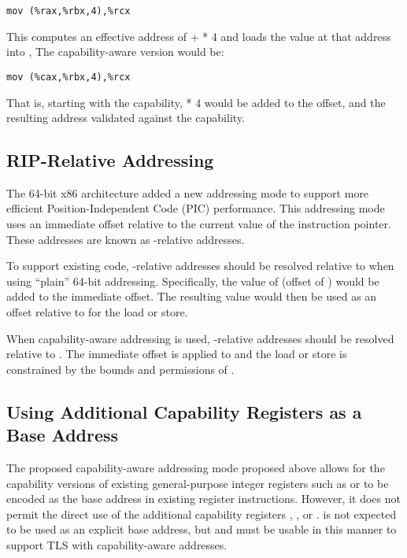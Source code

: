 \begin{verbatim}
mov (%rax,%rbx,4),%rcx
\end{verbatim}

This computes an effective address of \RAX{} + \RBX{} * 4 and loads the value
at that address into \RCX{},  The capability-aware version would be:

\begin{verbatim}
mov (%cax,%rbx,4),%rcx
\end{verbatim}

That is, starting with the \CAX{} capability, \RBX{} * 4 would be added to the
offset, and the resulting address validated against the \CAX{} capability.

\subsection{RIP-Relative Addressing}

The 64-bit x86 architecture added a new addressing mode to support more
efficient Position-Independent Code (PIC) performance.
This addressing mode uses an immediate offset
relative to the current value of the instruction
pointer.  These addresses are known as \RIP{}-relative addresses.

To support existing code, \RIP{}-relative addresses should be resolved
relative to \DDC{} when using ``plain'' 64-bit addressing.
Specifically, the value of \RIP{} (offset of \CIP{}) would be added to
the immediate offset.  The resulting value would then be used as an
offset relative to \DDC{} for the load or store.

When capability-aware addressing is used, \RIP{}-relative addresses
should be resolved relative to \CIP{}.
The immediate offset is applied to \CIP{} and the load
or store is constrained by the bounds and permissions of \CIP{}.

\subsection{Using Additional Capability Registers as a Base Address}
\label{sec:x86:additional-caps-as-base}

The proposed capability-aware addressing mode proposed above allows
for the capability versions of existing general-purpose integer registers such
as \CAX{} or \CBP{} to be encoded as the base address in existing register instructions.
However, it does not permit the direct use of the additional
capability registers \DDC{}, \CFS{}, or \CGS{}.  \DDC{} is not expected to be
used as an explicit base address, but \CFS{} and \CGS{} must be usable in this
manner to support TLS with capability-aware addresses.

